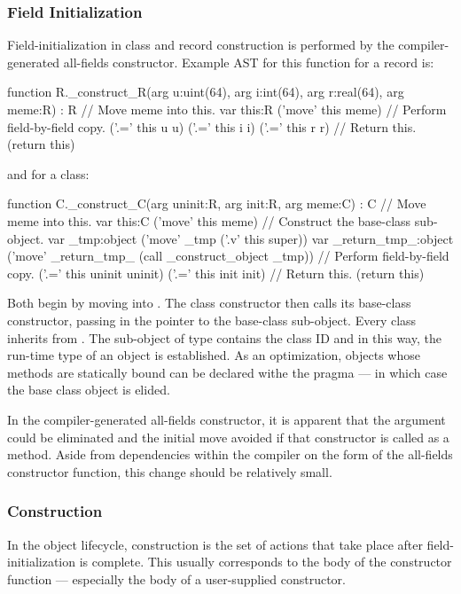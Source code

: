 \subsubsection{Field Initialization}

Field-initialization in class and record construction is performed by the
compiler-generated all-fields constructor.  Example AST for this function for a record is:
\begin{chapelcode}
  function R._construct_R(arg u:uint(64), arg i:int(64), arg r:real(64), arg meme:R) : R
  {
    // Move meme into this.
    var this:R
    ('move' this meme)
    // Perform field-by-field copy.
    ('.=' this u u)
    ('.=' this i i)
    ('.=' this r r)
    // Return this.
    (return this)
  }
\end{chapelcode}
\noindent
and for a class:
\begin{chapelcode}
  function C._construct_C(arg uninit:R, arg init:R, arg meme:C) : C
  {
    // Move meme into this.
    var this:C
    ('move' this meme)
    // Construct the base-class sub-object.
    var _tmp:object
    ('move' _tmp ('.v' this super))
    var _return_tmp_:object
    ('move' _return_tmp_ (call _construct_object _tmp))
    // Perform field-by-field copy.
    ('.=' this uninit uninit)
    ('.=' this init init)
    // Return this.
    (return this)
  }
\end{chapelcode}
\noindent
Both begin by moving  into .  The class constructor then calls its
base-class constructor, passing in the pointer to the base-class sub-object.  Every class
inherits from .  The sub-object of type  contains the class ID
and in this way, the run-time type of an object is established.  As an optimization,
objects whose methods are statically bound can be declared withe the  pragma ---
in which case the  base class object is elided.

In the compiler-generated all-fields constructor, it is apparent that the 
argument could be eliminated and the initial move avoided if that constructor is called as
a method.  Aside from dependencies within the compiler on the form of the all-fields
constructor function, this change should be relatively small.

\subsubsection{Construction}

In the object lifecycle, construction is the set of actions that take place after
field-initialization is complete.  This usually corresponds to the body of the constructor
function --- especially the body of a user-supplied constructor.

